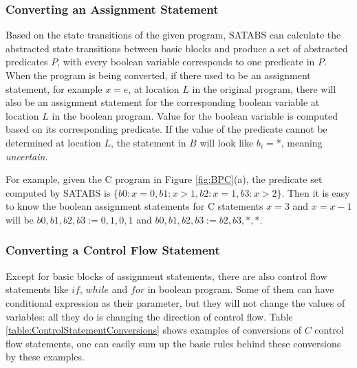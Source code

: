 \subsubsection{Converting an Assignment Statement}
\label{section:ConvertingAnAssignmentStatement}
Based on the state transitions of the given program, SATABS can calculate the abstracted state transitions between basic blocks and produce a set of abstracted predicates $P$, with every boolean variable corresponds to one predicate in $P$.
When the program is being converted, if there used to be an assignment statement, for example $x = e$, at location $L$ in the original program, there will also be an assignment statement for the corresponding boolean variable at location $L$ in the boolean program\cite{MLS:STEPaBP}.
Value for the boolean variable is computed based on its corresponding predicate.
If the value of the predicate cannot be determined at location $L$, the statement in $B$ will look like $b_{i} = *$, meaning {\it uncertain}.

For example, given the C program in Figure \ref{fig:BPC}(a), the predicate set computed by SATABS is $\{b0 : x = 0, b1 : x > 1, b2 : x = 1, b3 : x > 2\}$. Then it is easy to know the boolean assignment statements for C statements $x = 3$ and $x = x - 1$ will be $b0,b1,b2,b3 := 0,1,0,1$ and $b0,b1,b2,b3 := b2,b3,*,*$.

\subsubsection{Converting a Control Flow Statement}
\label{section:ConvertingAControlFlowStatement}
Except for basic blocks of assignment statements, there are also control flow statements like $if$, $while$ and $for$ in boolean program.
Some of them can have conditional expression as their parameter, but they will not change the values of variables: all they do is changing the direction of control flow.
Table \ref{table:ControlStatementConversions} shows examples of conversions of $C$ control flow statements, one can easily sum up the basic rules behind these conversions by these examples.

